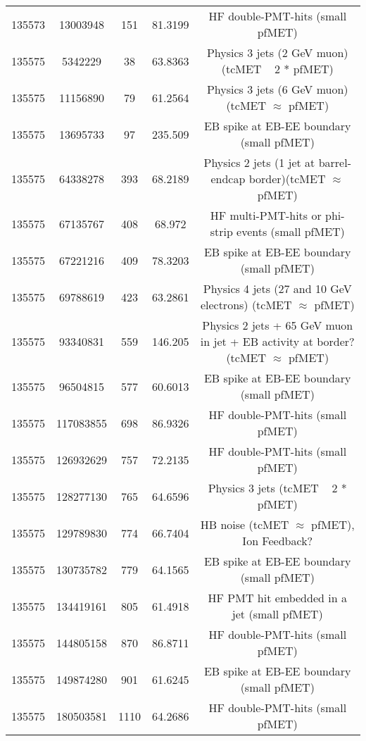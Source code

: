 \begin{table}[htbp]
\begin{center}
\begin{tabular}{|c|c|c|c|c|}
      135573  & 13003948     & 151  &    81.3199 & HF double-PMT-hits (small pfMET) \\
      135575  & 5342229      & 38   &    63.8363 & Physics 3 jets (2 GeV muon) (tcMET ~ 2 * pfMET) \\
      135575  & 11156890     & 79   &    61.2564 & Physics 3 jets (6 GeV muon) (tcMET $\approx$ pfMET) \\
      135575  & 13695733     & 97   &    235.509 & EB spike at EB-EE boundary (small pfMET) \\
      135575  & 64338278     & 393  &    68.2189 & Physics 2 jets (1 jet at barrel-endcap border)(tcMET $\approx$ pfMET) \\
      135575  & 67135767     & 408  &    68.972  & HF multi-PMT-hits or phi-strip events (small pfMET) \\
      135575  & 67221216     & 409  &    78.3203 & EB spike at EB-EE boundary (small pfMET) \\
      135575  & 69788619     & 423  &    63.2861 & Physics 4 jets (27 and 10 GeV electrons) (tcMET $\approx$ pfMET) \\
      135575  & 93340831     & 559  &    146.205 & Physics 2 jets + 65 GeV muon in jet + EB activity at border? (tcMET $\approx$ pfMET) \\
      135575  & 96504815     & 577  &    60.6013 & EB spike at EB-EE boundary (small pfMET) \\
      135575  & 117083855    & 698  &    86.9326 & HF double-PMT-hits (small pfMET) \\
      135575  & 126932629    & 757  &    72.2135 & HF double-PMT-hits (small pfMET) \\
      135575  & 128277130    & 765  &    64.6596 & Physics 3 jets (tcMET ~ 2 * pfMET) \\
      135575  & 129789830    & 774  &    66.7404 & HB noise (tcMET $\approx$ pfMET), Ion Feedback? \\
      135575  & 130735782    & 779  &    64.1565 & EB spike at EB-EE boundary (small pfMET) \\
      135575  & 134419161    & 805  &    61.4918 & HF PMT hit embedded in a jet (small pfMET) \\
      135575  & 144805158    & 870  &    86.8711 & HF double-PMT-hits (small pfMET) \\
      135575  & 149874280    & 901  &    61.6245 & EB spike at EB-EE boundary (small pfMET) \\
      135575  & 180503581    & 1110 &    64.2686 & HF double-PMT-hits (small pfMET) \\

\end{tabular}
\end{center}
\end{table}
